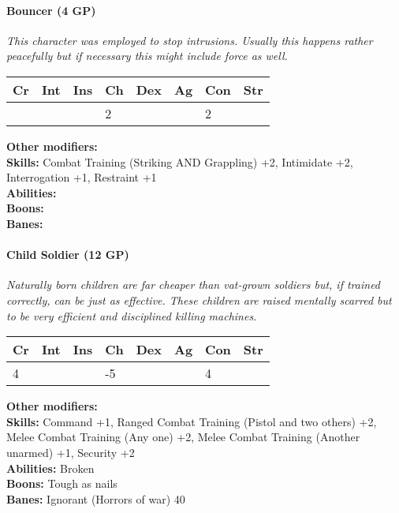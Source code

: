 \hrulefill
\paragraph*{Bouncer (4 GP)}
\textit{This character was employed to stop intrusions. Usually this happens rather peacefully but if necessary this might include force as well.}\par
\begin{tabular}{|l|l|l|l|l|l|l|l|}
	\hline
	Cr & Int & Ins & Ch & Dex & Ag & Con & Str \\ \hline
	&  &  & 2 &  &  & 2 &  \\ \hline
\end{tabular}\par
\noindent\textbf{Other modifiers:} \\
\textbf{Skills:} Combat Training (Striking AND Grappling) +2,
Intimidate +2,
Interrogation +1,
Restraint +1\\
\textbf{Abilities:} \\
\textbf{Boons:} \\
\textbf{Banes:} \\

\hrulefill
\paragraph*{Child Soldier (12 GP)}
\textit{Naturally born children are far cheaper than vat-grown soldiers but, if trained correctly, can be just as effective. These children are raised mentally scarred but to be very efficient and disciplined killing machines.}\par
\begin{tabular}{|l|l|l|l|l|l|l|l|}
	\hline
	Cr & Int & Ins & Ch & Dex & Ag & Con & Str \\ \hline
	4 &  &  & -5 &  &  & 4 &  \\ \hline
\end{tabular}\par
\noindent\textbf{Other modifiers:} \\
\textbf{Skills:} Command +1,
Ranged Combat Training (Pistol and two others) +2,
Melee Combat Training (Any one) +2,
Melee Combat Training (Another unarmed) +1,
Security +2\\
\textbf{Abilities:} Broken\\
\textbf{Boons:} Tough as nails\\
\textbf{Banes:} Ignorant (Horrors of war) 40\\

\hrulefill
